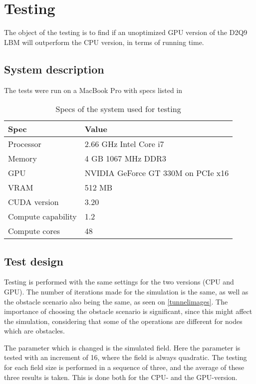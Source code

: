 \section{Testing}\label{sec:testing}
The object of the testing is to find if an unoptimized GPU version of the D2Q9 LBM will outperform the CPU version, in terms of running time.

\subsection{System description}
The tests were run on a MacBook Pro with specs listed in 

\begin{table}[htb]
	\centering
	\begin{tabular}{ll}
		\toprule
		Spec & Value \\
		\midrule
		Processor & 2.66 GHz Intel Core i7 \\
		Memory & 4 GB 1067 MHz DDR3 \\
		GPU & NVIDIA GeForce GT 330M on PCIe x16\\
		VRAM & 512 MB\\
		CUDA version & 3.20\\
		Compute capability & 1.2\\
		Compute cores & 48\\		
		\bottomrule
	\end{tabular}
	\caption{Specs of the system used for testing}
	\label{specs}
\end{table}

\subsection{Test design}
Testing is performed with the same settings for the two versions (CPU and GPU). The number of iterations made for the simulation is the same, as well as the obstacle scenario also being the same, as seen on \autoref{tunnelimages}. The importance of choosing the obstacle scenario is significant, since this might affect the simulation, considering that some of the operations are different for nodes which are obstacles.

The parameter which is changed is the simulated field. Here the parameter is tested with an increment of 16, where the field is always quadratic. The testing for each field size is performed in a sequence of three, and the average of these three results is taken. This is done both for the CPU- and the GPU-version.

